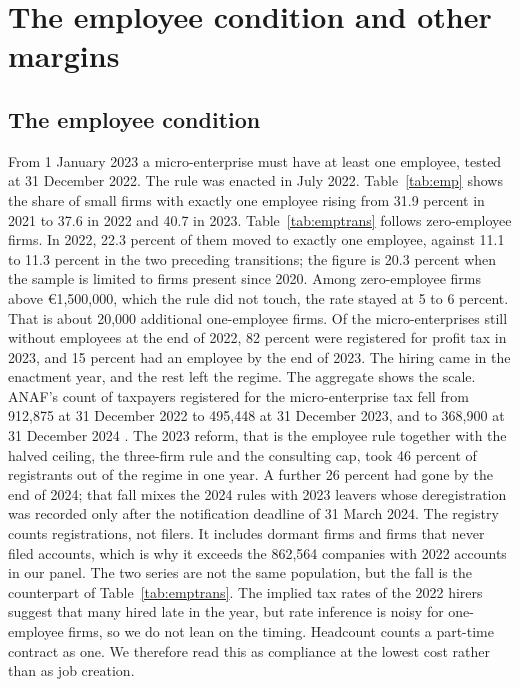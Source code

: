 \documentclass[12pt]{article}
\begin{document}


\FloatBarrier
\section{The employee condition and other margins}\label{sec:other}

\subsection{The employee condition}

From 1 January 2023 a micro-enterprise must have at least one employee, tested at 31 December 2022. The rule was enacted in July 2022. Table~\ref{tab:emp} shows the share of small firms with exactly one employee rising from 31.9 percent in 2021 to 37.6 in 2022 and 40.7 in 2023. Table~\ref{tab:emptrans} follows zero-employee firms. In 2022, 22.3 percent of them moved to exactly one employee, against 11.1 to 11.3 percent in the two preceding transitions; the figure is 20.3 percent when the sample is limited to firms present since 2020. Among zero-employee firms above \euro{}1,500,000, which the rule did not touch, the rate stayed at 5 to 6 percent. That is about 20,000 additional one-employee firms. Of the micro-enterprises still without employees at the end of 2022, 82 percent were registered for profit tax in 2023, and 15 percent had an employee by the end of 2023. The hiring came in the enactment year, and the rest left the regime. The aggregate shows the scale. ANAF's count of taxpayers registered for the micro-enterprise tax fell from 912,875 at 31 December 2022 to 495,448 at 31 December 2023, and to 368,900 at 31 December 2024 \citep[Table 2.2]{anaf2024, anaf2025}. The 2023 reform, that is the employee rule together with the halved ceiling, the three-firm rule and the consulting cap, took 46 percent of registrants out of the regime in one year. A further 26 percent had gone by the end of 2024; that fall mixes the 2024 rules with 2023 leavers whose deregistration was recorded only after the notification deadline of 31 March 2024. The registry counts registrations, not filers. It includes dormant firms and firms that never filed accounts, which is why it exceeds the 862,564 companies with 2022 accounts in our panel. The two series are not the same population, but the fall is the counterpart of Table~\ref{tab:emptrans}. The implied tax rates of the 2022 hirers suggest that many hired late in the year, but rate inference is noisy for one-employee firms, so we do not lean on the timing. Headcount counts a part-time contract as one. We therefore read this as compliance at the lowest cost rather than as job creation.
\end{document}
